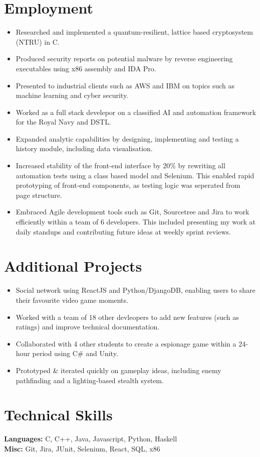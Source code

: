 \documentclass{cvclass}
\begin{document}
\section{\textbf{Employment}}
\begin{itemize}
\itemsep0em
\item Researched and implemented a quantum-resilient, lattice based cryptosystem (NTRU) in C.
\item Produced security reports on potential malware by reverse engineering executables using x86 assembly and IDA Pro.
\item Presented to industrial clients such as AWS and IBM on topics such as machine learning and cyber security.
\end{itemize}
\begin{itemize}
\itemsep0em 
\item Worked as a full stack develepor on a classified AI and automation framework for the Royal Navy and DSTL.
\item Expanded analytic capabilities by designing, implementing and testing a history module, including data visualisation.
\item Increased stability of the front-end interface by 20\% by rewriting all automation tests using a class based model and Selenium. This enabled rapid prototyping of front-end components, as testing logic was seperated from page structure.
\item Embraced Agile development tools such as Git, Sourcetree and Jira to work efficiently within a team of 6 developers. This included presenting my work at daily standups and contributing future ideas at weekly sprint reviews.
\end{itemize}
\section{\textbf{Additional Projects}}

\begin{itemize}
\itemsep0em
\item Social network using ReactJS and Python/DjangoDB, enabling users to share their favourite video game moments.
\item Worked with a team of 18 other devleopers to add new features (such as ratings)  and improve technical documentation.
\end{itemize}
\begin{itemize}
\itemsep0em
\item Collaborated with 4 other students to create a espionage game within a 24-hour period using C\# and Unity.
\item Prototyped \& iterated quickly on gameplay ideas, including enemy pathfinding and a lighting-based stealth system.
\end{itemize}
\section{\textbf{Technical Skills}}
\textbf{\large{Languages:}} C, C++, Java, Javascript, Python, Haskell\\
\textbf{\large{Misc:}} Git, Jira, JUnit, Selenium, React, SQL, x86
\end{document}
